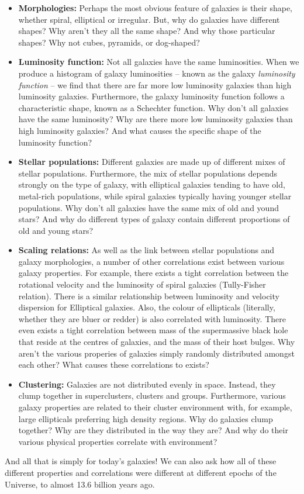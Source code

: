 \documentclass[11pt]{article}
\begin{document}
\begin{itemize}
\item {\bf Morphologies:} Perhaps the most obvious feature of galaxies
  is their shape, whether spiral, elliptical or irregular. But, why do
  galaxies have different shapes? Why aren't they all the same shape?
  And why those particular shapes? Why not cubes, pyramids, or
  dog-shaped?
\item {\bf Luminosity function:} Not all galaxies have the same
  luminosities. When we produce a histogram of galaxy luminosities --
  known as the galaxy {\it luminosity function} -- we find that there
  are far more low luminosity galaxies than high luminosity
  galaxies. Furthermore, the galaxy luminosity function follows a
  characteristic shape, known as a Schechter function. Why don't all
  galaxies have the same luminosity? Why are there more low luminosity
  galaxies than high luminosity galaxies? And what causes the specific
  shape of the luminosity function?
\item {\bf Stellar populations:} Different galaxies are made up of
  different mixes of stellar populations. Furthermore, the mix of
  stellar populations depends strongly on the type of galaxy, with
  elliptical galaxies tending to have old, metal-rich populations,
  while spiral galaxies typically having younger stellar
  populations. Why don't all galaxies have the same mix of old and
  yound stars? And why do different types of galaxy contain different
  proportions of old and young stars?
\item {\bf Scaling relations:} As well as the link between stellar
  populations and galaxy morphologies, a number of other correlations
  exist between various galaxy properties. For example, there exists a
  tight correlation between the rotational velocity and the luminosity
  of spiral galaxies (Tully-Fisher relation). There is a similar
  relationship between luminosity and velocity dispersion for
  Elliptical galaxies. Also, the colour of ellipticals (literally,
  whether they are bluer or redder) is also correlated with
  luminosity. There even exists a tight correlation between mass of
  the supermassive black hole that reside at the centres of galaxies,
  and the mass of their host bulges. Why aren't the various properies
  of galaxies simply randomly distributed amongst each other? What
  causes these correlations to exists?
\item {\bf Clustering:} Galaxies are not distributed evenly in
  space. Instead, they clump together in superclusters, clusters and
  groups. Furthermore, various galaxy properties are related to their
  cluster environment with, for example, large ellipticals preferring
  high density regions. Why do galaxies clump together? Why are they
  distributed in the way they are? And why do their various physical
  properties correlate with environment?
\end{itemize}
And all that is simply for today's galaxies! We can also ask how all
of these different properties and correlations were different at
different epochs of the Universe, to almost 13.6 billion years ago.
\end{document}
